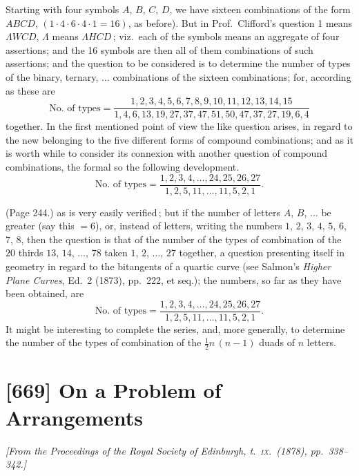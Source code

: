 \documentclass[11pt,a4paper]{book}
\begin{document}
Starting with four symbols $A$, $B$, $C$, $D$, we have sixteen combinations of the form $ABCD$, $(1\cdot 4\cdot 6\cdot 4\cdot 1 = 16)$, as before). But in Prof.\ Clifford's question 1 means $\Lambda WCD$, $\Lambda$ means $\Lambda HCD$\,; viz.\ each of the symbols means an aggregate of four assertions; and the 16 symbols are then all of them combinations of such assertions; and the question to be considered is to determine the number of types of the binary, ternary, $\ldots$ combinations of the sixteen combinations; for, according as these are
\[
\text{No.\ of types} = \frac{1, 2, 3, 4, 5, 6, 7, 8, 9, 10, 11, 12, 13, 14, 15}{1, 4, 6, 13, 19, 27, 37, 47, 51, 50, 47, 37, 27, 19, 6, 4}
\]
together. In the first mentioned point of view the like question arises, in regard to the new belonging to the five different forms of compound combinations; and as it is worth while to consider its connexion with another question of compound combinations, the formal so the following development.
\[
\text{No.\ of types} = \frac{1, 2, 3, 4, \ldots, 24, 25, 26, 27}{1, 2, 5, 11, \ldots, 11, 5, 2, 1}.
\]

\medskip

\noindent (Page 244.) as is very easily verified\,; but if the number of letters $A$, $B$, $\ldots$ be greater (say this $= 6$), or, instead of letters, writing the numbers $1$, $2$, $3$, $4$, $5$, $6$, $7$, $8$, then the question is that of the number of the types of combination of the $20$ thirds $13$, $14$, $\ldots$, $78$ taken $1$, $2$, $\ldots$, $27$ together, a question presenting itself in geometry in regard to the bitangents of a quartic curve (see Salmon's \emph{Higher Plane Curves}, Ed.\ 2 (1873), pp.\ 222, et seq.); the numbers, so far as they have been obtained, are
\[
\text{No.\ of types} = \frac{1, 2, 3, 4, \ldots, 24, 25, 26, 27}{1, 2, 5, 11, \ldots, 11, 5, 2, 1}.
\]
It might be interesting to complete the series, and, more generally, to determine the number of the types of combination of the $\tfrac{1}{2}n\,(n - 1)$ duads of $n$ letters.

\bigskip

\section{[669] On a Problem of Arrangements}
\label{sec:669}

\noindent\textit{[From the \emph{Proceedings of the Royal Society of Edinburgh}, t.~\textsc{ix.}\ (1878), pp.~338--342.]}
\end{document}
